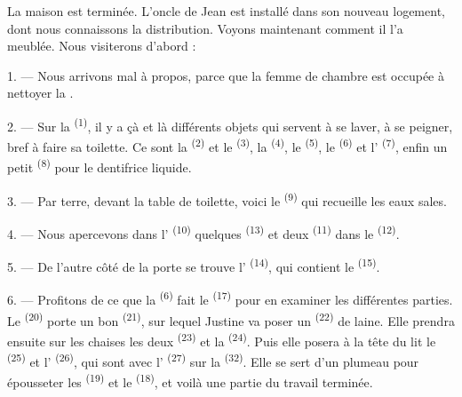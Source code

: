 La maison est terminée. L'oncle de Jean est installé dans son nouveau logement,
dont nous connaissons la distribution. Voyons maintenant comment il l'a
meublée. Nous visiterons d'abord :

\VUsaut{3.0mm}

1. --- Nous arrivons mal à propos, parce que la femme de chambre est occupée à
nettoyer la .

2. --- Sur la  \textsuperscript{(1)}, il y a çà et là
différents objets qui servent à se laver, à se peigner, bref à faire sa
toilette. Ce sont la  \textsuperscript{(2)} et le  \textsuperscript{(3)}, la  \textsuperscript{(4)},
le  \textsuperscript{(5)}, le 
\textsuperscript{(6)} et l' \textsuperscript{(7)}, enfin un petit
 \textsuperscript{(8)} pour le dentifrice liquide.

3. --- Par terre, devant la table de toilette, voici le 
\textsuperscript{(9)} qui recueille les eaux sales.

4. --- Nous apercevons dans l' \textsuperscript{(10)}
quelques  \textsuperscript{(13)} et deux 
\textsuperscript{(11)} dans le 
\textsuperscript{(12)}.

5. --- De l'autre côté de la porte se trouve l'
\textsuperscript{(14)}, qui contient le  \textsuperscript{(15)}.

6. --- Profitons de ce que la  \textsuperscript{(6)}
fait le  \textsuperscript{(17)} pour en examiner les différentes
parties. Le  \textsuperscript{(20)} porte un bon
 \textsuperscript{(21)}, sur lequel Justine va poser
un  \textsuperscript{(22)} de laine. Elle prendra ensuite sur
les chaises les deux  \textsuperscript{(23)} et la
 \textsuperscript{(24)}. Puis elle posera à la tête du lit
le  \textsuperscript{(25)} et l'
\textsuperscript{(26)}, qui sont avec l'
\textsuperscript{(27)} sur la  \textsuperscript{(32)}.
Elle se sert d'un plumeau pour épousseter les 
\textsuperscript{(19)} et le  \textsuperscript{(18)}, et
voilà une partie du travail terminée.


